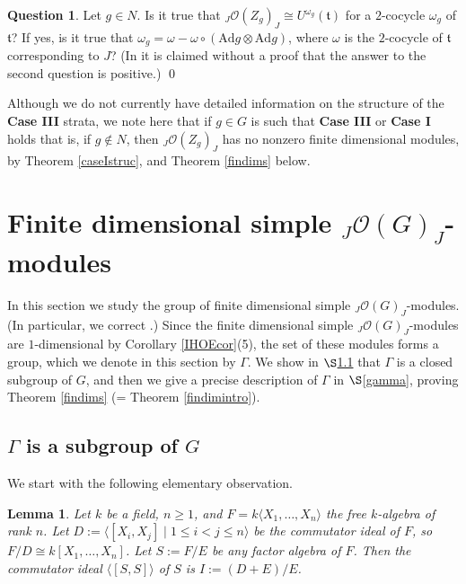 \documentclass{amsart}
\numberwithin{equation}{section}
\newtheorem{lemma}[theorem]{Lemma}
\theoremstyle{definition}
\newtheorem{question}[theorem]{Question}
\begin{document}
\begin{question}\label{compwg2q2}
Let $g\in N$. Is it true that ${}_J\mathcal{O}(Z_g)_J\cong U^{\omega_g}(\mathfrak{t})$ for a $2$-cocycle $\omega_g$ of $\mathfrak{t}$? If yes, is it true that $\omega_g=\omega - \omega \circ (\mathrm{Ad}g \otimes \mathrm{Ad}g)$, where $\omega$ is the $2$-cocycle of $\mathfrak{t}$ corresponding to $J$? (In \cite[Theorem 4.5]{G2} it is claimed without a proof that the answer to the second question is positive.) \qed
\end{question}

Although we do not currently have detailed information on the structure of the {\bf Case III} strata, we note here that if $g \in G$ is such that {\bf Case III} or {\bf Case I} holds that is, if $g \notin N$, then ${}_J\mathcal{O}(Z_g)_J$ has no nonzero finite dimensional modules, by Theorem \ref{caseIstruc}, and Theorem \ref{findims} below.

\section{Finite dimensional simple ${}_J\mathcal{O}(G)_J$-modules}\label{simples2}

In this section we study the group of finite dimensional simple ${}_J\mathcal{O}(G)_J$-modules. (In particular, we correct \cite[Theorem 5.2]{G2}.) Since the finite dimensional simple ${}_J\mathcal{O}(G)_J$-modules are $1$-dimensional by Corollary \ref{IHOEcor}(5), the set of these modules forms a group, which we denote in this section by $\Gamma$. We show in $\S$\ref{subgp} that $\Gamma$ is a closed subgroup of $G$, and then we give a precise description of $\Gamma$ in $\S$\ref{gamma}, proving Theorem \ref{findims} (= Theorem \ref{findimintro}).

\subsection{$\Gamma$ is a subgroup of $G$}\label{subgp} We start with the following elementary observation.

\begin{lemma}\label{free} 
Let $k$ be a field, $n \geq 1$, and $F = k\langle X_1,\dots, X_n \rangle$ the free $k$-algebra of rank $n$. Let $D :=\langle [X_i,X_j]\mid 1\leq i < j \leq n \rangle$ be the commutator ideal of $F$, so $ F/D \cong k[X_1,\dots, X_n]$. Let $S := F/E$ be any factor algebra of $F$. Then the commutator ideal $\langle [S,S] \rangle$ of $S$ is $I := (D + E)/E$. 
\end{lemma}
\end{document}
